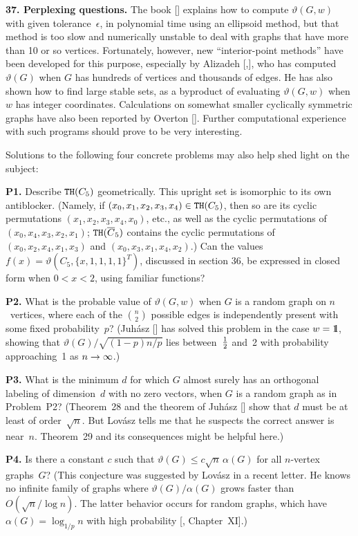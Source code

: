 \meno
{\bf 37. Perplexing questions.}\quad
The book [\GLSbook] explains how to compute $\vartheta(G,w)$ with given
tolerance~$\epsilon$, in polynomial time using an ellipsoid method, but that 
method is too slow and
numerically unstable to deal with graphs that have more than 10 or so vertices.
Fortunately, however, new ``interior-point methods'' have been developed
for this purpose,
especially by Alizadeh [\Ala,\Alb], who has computed $\vartheta(G)$ when $G$ has
hundreds of vertices and thousands of edges. He has also shown how to find
large stable sets, as a
byproduct of evaluating $\vartheta(G,w)$ when $w$ has integer coordinates.
Calculations on somewhat smaller cyclically symmetric
graphs  have also been reported
by Overton [\Ov]. Further
computational experience with such programs should prove to be very
interesting.

Solutions to
the following four concrete problems may also help shed light on the
subject: 

{\bf P1.}\quad
Describe ${\tt TH}(C_5)$ geometrically. This upright set is isomorphic to its
own anti\-blocker. (Namely, if $(x_0,x_1,x_2,x_3,x_4)\in{\tt TH}(C_5)$, then so
are its cyclic permutations $(x_1,x_2,x_3,x_4,x_0)$, etc., as well as the
cyclic permutations of $(x_0,x_4,x_3,x_2,x_1)$; ${\tt TH}(\overline{C}_5)$
contains the cyclic permutations of $(x_0,x_2,x_4, x_1,x_3)$ and
$(x_0,x_3,x_1,x_4,x_2)$.) Can the values
$f(x)=\vartheta(C_5,\{x,1,1,1,1\}^T)$,
discussed in section 36, be expressed in closed form when $0<x<2$,
using familiar functions?

{\bf P2.}\quad
What is the probable value of $\vartheta(G,w)$ when $G$ is a random graph on
$n$~vertices, where each of the ${n\choose 2}$ possible edges is independently
present with some fixed probability~$p$? (Juh\'asz [\Ju] has solved this
problem in the case $w={1\mskip-4.5mu\rm l}$, showing that $\vartheta(G)/\sqrt{(1-p)n/p}$ lies
between~${1\over 2}$ and~2 with probability approaching~1 as $n\rightarrow\infty$.)

{\bf P3.}\quad 
What is the minimum $d$ for which $G$ almost surely 
has an orthogonal labeling of
dimension~$d$ with no zero vectors, when $G$ is a random graph as in
Problem~P2?  (Theorem~28 and the theorem of Juh\'asz [\Ju] show that $d$ must
be at least of order~$\sqrt{n}$. But Lov\'asz tells me that he suspects the
correct answer is near~$n$. Theorem~29 and its consequences might be helpful
here.)

{\bf P4.}\quad
Is there a constant $c$ such that $\vartheta(G)\leq
c\sqrt{n}\,\alpha(G)$ for all
$n$-vertex graphs~$G$? (This conjecture was suggested by Lov\'asz in a recent
letter. He knows no infinite family of graphs where $\vartheta(G)/\alpha(G)$
grows faster than $O(\sqrt{n}/\log n)$. The latter behavior occurs for random
graphs, which have $\alpha(G)=\log_{1/p}n$ with high probability [\Bol,
Chapter~XI].)

